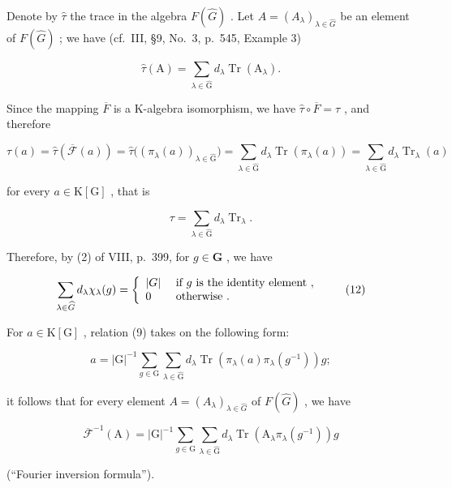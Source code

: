 Denote by \(\widehat{\tau}\) the trace in the algebra \(F(\widehat{G})\) . Let \(A = (A_{\lambda})_{\lambda \in \widehat{G}}\) be an element of \(F(\widehat{G})\) ; we have (cf.~III, §9, No.~3, p.~545, Example 3)

\[
\widehat {\tau} (\mathrm{A}) = \sum_ {\lambda \in \widehat {\mathrm{G}}} d _ {\lambda} \operatorname{Tr} (\mathrm{A} _ {\lambda}).\tag{10}
\]

Since the mapping \(\overline{F}\) is a K-algebra isomorphism, we have \(\widehat{\tau}\circ\overline{F}=\tau\) , and therefore

\[
\tau (a) = \widehat {\tau} (\overline {{\mathcal {F}}} (a)) = \widehat {\tau} \big ((\pi_ {\lambda} (a)) _ {\lambda \in \widehat {\mathrm{G}}} \big) = \sum_ {\lambda \in \widehat {\mathrm{G}}} d _ {\lambda} \operatorname{Tr} (\pi_ {\lambda} (a)) = \sum_ {\lambda \in \widehat {\mathrm{G}}} d _ {\lambda} \operatorname{Tr} _ {\lambda} (a)
\]

for every \(a\in \mathrm{K}[\mathrm{G}]\) , that is

\[
\tau = \sum_ {\lambda \in \widehat {\mathrm{G}}} d _ {\lambda} \operatorname{Tr} _ {\lambda}.\tag{11}
\]

Therefore, by (2) of VIII, p.~399, for \(g \in \mathbf{G}\) , we have

\[
\sum_ {\lambda \in \widehat {G}} d _ {\lambda}   \chi_ {\lambda} (g) = \left\{ \begin{array}{l l} | G | & \text { if   } g \text {   is   the   identity   element }, \\ 0 & \text { otherwise }. \end{array} \right.\tag{12}
\]

For \(a \in \mathrm{K}[\mathrm{G}]\) , relation (9) takes on the following form:

\[
a = | \mathrm{G} | ^ {- 1} \sum_ {g \in \mathrm{G}} \sum_ {\lambda \in \widehat {\mathrm{G}}} d _ {\lambda} \left. \operatorname{Tr} (\pi_ {\lambda} (a) \pi_ {\lambda} (g ^ {- 1})) g; \right.\tag{13}
\]

it follows that for every element \(A = (A_{\lambda})_{\lambda \in \widehat{G}}\) of \(F(\widehat{G})\) , we have

\[
\overline {{\mathcal {F}}} ^ {- 1} (\mathrm{A}) = | \mathrm{G} | ^ {- 1} \sum_ {g \in \mathrm{G}} \sum_ {\lambda \in \widehat {\mathrm{G}}} d _ {\lambda} \operatorname{Tr} (\mathrm{A} _ {\lambda} \pi_ {\lambda} (g ^ {- 1})) g\tag{14}
\]

(``Fourier inversion formula'').

